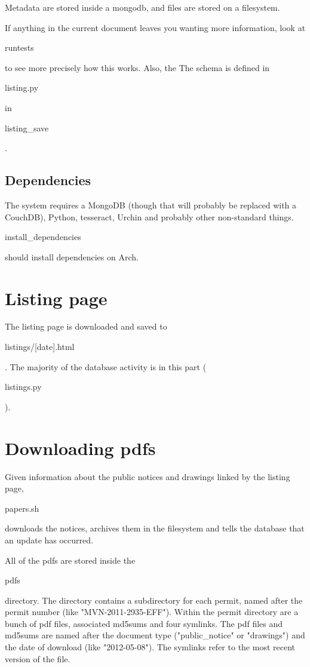 \documentclass{article}
\begin{document}
Metadata are stored inside a mongodb, and files are stored on a filesystem.

If anything in the current document leaves you wanting more information, look
at \begin{texttt}runtests\end{texttt} to see more precisely how this works.
Also, the The schema is defined in \begin{texttt}listing.py\end{texttt} in
\begin{texttt}listing\_save\end{texttt}.

\subsection{Dependencies}
The system requires a MongoDB (though that will probably be replaced with a
CouchDB), Python, tesseract, Urchin and probably other non-standard things.
\begin{texttt}install\_dependencies\end{texttt} should install dependencies
on Arch.

\section{Listing page}
The listing page is downloaded and saved to \begin{texttt}listings/[date].html\end{texttt}.
The majority of the database activity is in this part (\begin{texttt}listings.py\end{texttt}).

\section{Downloading pdfs}
Given information about the public notices and drawings linked by the listing
page, \begin{texttt}papers.sh\end{texttt} downloads the notices, archives them in the filesystem
and tells the database that an update has occurred.

All of the pdfs are stored inside the \begin{texttt}pdfs\end{texttt} directory. The directory contains
a subdirectory for each permit, named after the permit number (like
"MVN-2011-2935-EFF"). Within the permit directory are a bunch of pdf files,
associated md5sums and four symlinks. The pdf files and md5sums are named
after the document type ("public\_notice" or "drawings") and the date of download
(like "2012-05-08"). The symlinks refer to the most recent version of the file.
\end{document}
